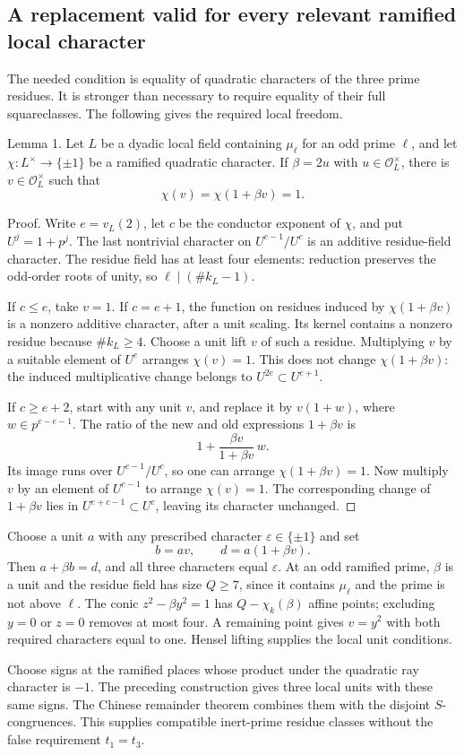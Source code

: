 \documentclass[10pt]{article}
\begin{document}
\subsection*{A replacement valid for every relevant ramified local character}
The needed condition is equality of quadratic characters of the three prime residues. It is stronger than necessary to require equality of their full squareclasses. The following gives the required local freedom.\par
Lemma 1.  Let \(L\) be a dyadic local field containing \(\mu_\ell\) for an odd prime \(\ell\), and let \(\chi:L^\times\to\{\pm1\}\) be a ramified quadratic character. If \(\beta=2u\) with \(u\in\mathcal O_L^\times\), there is \(v\in\mathcal O_L^\times\) such that \[\chi(v)=\chi(1+\beta v)=1.\]\par
Proof. Write \(e=v_L(2)\), let \(c\) be the conductor exponent of \(\chi\), and put \(U^j=1+ p^j\). The last nontrivial character on \(U^{c-1}/U^c\) is an additive residue-field character. The residue field has at least four elements: reduction preserves the odd-order roots of unity, so \(\ell\mid(\#k_L-1)\).\par
If \(c\le e\), take \(v=1\). If \(c=e+1\), the function on residues induced by \(\chi(1+\beta v)\) is a nonzero additive character, after a unit scaling. Its kernel contains a nonzero residue because \(\#k_L\ge4\). Choose a unit lift \(v\) of such a residue. Multiplying \(v\) by a suitable element of \(U^e\) arranges \(\chi(v)=1\). This does not change \(\chi(1+\beta v)\): the induced multiplicative change belongs to \(U^{2e}\subset U^{e+1}\).\par
If \(c\ge e+2\), start with any unit \(v\), and replace it by \(v(1+w)\), where \(w\in p^{c-e-1}\). The ratio of the new and old expressions \(1+\beta v\) is \[1+\frac{\beta v}{1+\beta v}\,w .\] Its image runs over \(U^{c-1}/U^c\), so one can arrange \(\chi(1+\beta v)=1\). Now multiply \(v\) by an element of \(U^{c-1}\) to arrange \(\chi(v)=1\). The corresponding change of \(1+\beta v\) lies in \(U^{e+c-1}\subset U^c\), leaving its character unchanged. ◻\par
Choose a unit \(a\) with any prescribed character \(\varepsilon\in\{\pm1\}\) and set \[b=av,\qquad d=a(1+\beta v).\] Then \(a+\beta b=d\), and all three characters equal \(\varepsilon\). At an odd ramified prime, \(\beta\) is a unit and the residue field has size \(Q\ge7\), since it contains \(\mu_\ell\) and the prime is not above \(\ell\). The conic \(z^2-\beta y^2=1\) has \(Q-\chi_k(\beta)\) affine points; excluding \(y=0\) or \(z=0\) removes at most four. A remaining point gives \(v=y^2\) with both required characters equal to one. Hensel lifting supplies the local unit conditions.\par
Choose signs at the ramified places whose product under the quadratic ray character is \(-1\). The preceding construction gives three local units with these same signs. The Chinese remainder theorem combines them with the disjoint \(S\)-congruences. This supplies compatible inert-prime residue classes without the false requirement \(t_1=t_3\).\par
\end{document}
